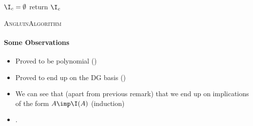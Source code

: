 \begin{algorithm}
	\KwIn{$\I$}
	
	\BlankLine
	\BlankLine
	
	$\I_c = \emptyset$ \;
	return $\I_c$ \;
	
	\caption{\textsc{AngluinAlgorithm}}
	\label{alg:Angluin}
\end{algorithm}

\paragraph{Some Observations} \begin{itemize}
	\item Proved to be polynomial (\cite{angluin_learning_1992})
	\item Proved to end up on the DG basis (\cite{arias_canonical_2009})
	\item We can see that (apart from previous remark) that we end up 
	on implications of the form $A \imp \I(A)$ (induction)
	\item .
\end{itemize}


